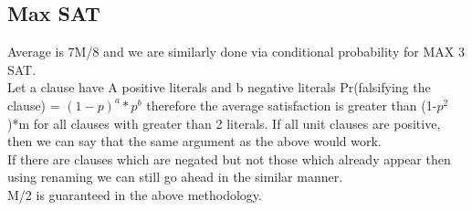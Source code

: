 \documentclass[solution,addpoints,12pt]{exam}
\begin{document}
\subsection{Max SAT}
Average is 7M/8 and we are similarly done via conditional
probability for MAX 3 SAT.\\
Let a clause have A positive literals and b negative literals
Pr(falsifying the clause) = ${(1-p)}^a*p^b$
therefore the average satisfaction is greater than (1-$p^2$)*m
for all clauses with greater than 2 literals.
If all unit clauses are positive, then we can
say that the same argument as the above would work.\\

If there are clauses which are negated but not those
which already appear then using renaming we can still go ahead
in the similar manner.\\
M/2 is guaranteed in the above methodology.\\
\end{document}
